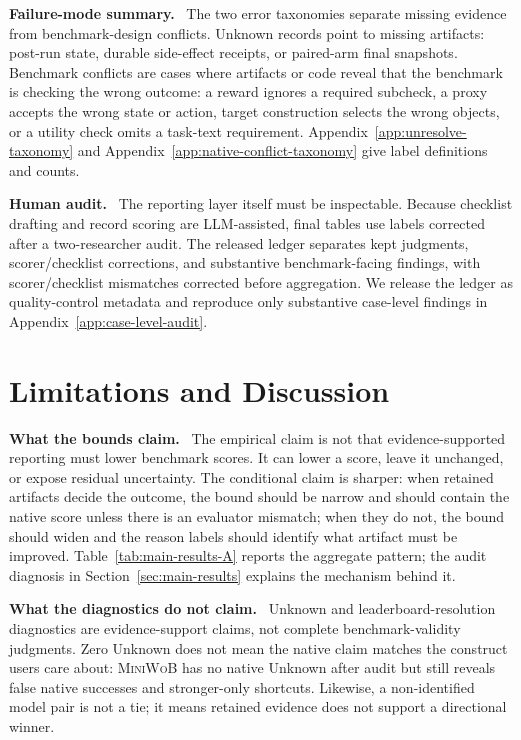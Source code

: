 \documentclass{article}
\newcommand{\miniwob}{\textsc{MiniWoB}\xspace}
\newcommand{\unknownLabel}{Unknown\xspace}
\newcommand{\runin}[1]{\noindent\textbf{#1}\ }
\begin{document}
\runin{Failure-mode summary.}
The two error taxonomies separate missing evidence from benchmark-design
conflicts.
\unknownLabel records point to missing artifacts: post-run
state, durable side-effect receipts, or paired-arm final snapshots. Benchmark
conflicts are cases where artifacts or code reveal that the
benchmark is checking the wrong outcome: a reward ignores a required subcheck,
a proxy accepts the wrong state or action, target construction selects the
wrong objects, or a utility check omits a task-text requirement.
Appendix~\ref{app:unresolve-taxonomy} and
Appendix~\ref{app:native-conflict-taxonomy} give label definitions and
counts.

\runin{Human audit.}
The reporting layer itself must be inspectable. Because checklist drafting and
record scoring are LLM-assisted, final tables use labels corrected after a
two-researcher audit. The released ledger separates kept judgments,
scorer/checklist corrections, and substantive benchmark-facing findings, with
scorer/checklist mismatches corrected before aggregation. We release the ledger
as quality-control metadata and reproduce only substantive case-level findings
in Appendix~\ref{app:case-level-audit}.

\section{Limitations and Discussion}
\label{sec:discussion}

\runin{What the bounds claim.}
The empirical claim is not that evidence-supported reporting must lower
benchmark scores. It can lower a score, leave it unchanged, or expose residual
uncertainty. The conditional claim is sharper: when retained
artifacts decide the outcome, the bound should be narrow and should
contain the native score unless there is an evaluator mismatch; when
they do not, the bound should widen and the reason labels should identify what
artifact must be improved. Table~\ref{tab:main-results-A} reports the
aggregate pattern; the audit diagnosis in Section~\ref{sec:main-results}
explains the mechanism behind it.

\runin{What the diagnostics do not claim.}
Unknown and leaderboard-resolution diagnostics are evidence-support claims, not
complete benchmark-validity judgments. Zero Unknown does not mean the native
claim matches the construct users care about: \miniwob has no native Unknown
after audit but still reveals false native successes and stronger-only
shortcuts. Likewise, a non-identified model pair is not a tie; it means retained
evidence does not support a directional winner.
\end{document}
